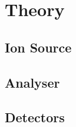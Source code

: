 \section{Theory} \label{sec:theory}
    \subsection{Ion Source}
    \subsection{Analyser}
    \subsection{Detectors}
    